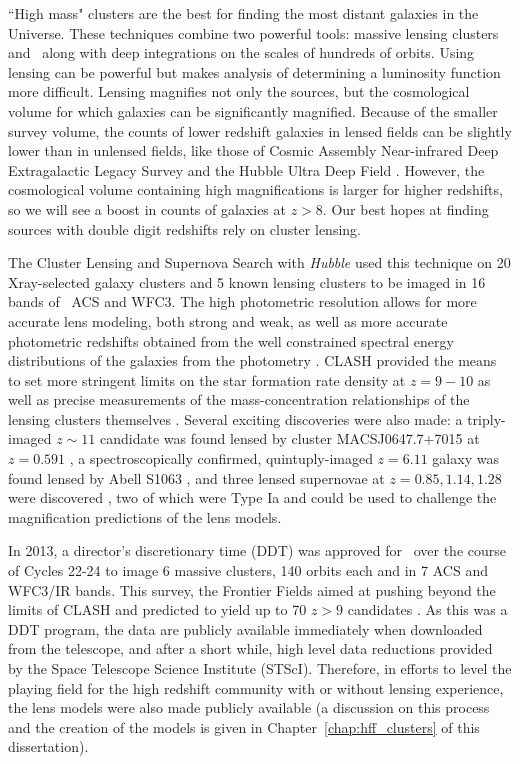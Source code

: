 ``High mass" clusters are the best for finding the most distant galaxies in the Universe. These techniques combine two powerful tools: massive lensing clusters and \hst\ along with deep integrations on the scales of hundreds of orbits. Using lensing can be powerful but makes analysis of determining a luminosity function more difficult. Lensing magnifies not only the sources, but the cosmological volume for which galaxies can be significantly magnified. Because of the smaller survey volume, the counts of lower redshift galaxies in lensed fields can be slightly lower than in unlensed fields, like those of Cosmic Assembly Near-infrared Deep Extragalactic Legacy Survey \citep[CANDELS; ][]{Grogin:2011ly} and the Hubble Ultra Deep Field \citep{Beckwith:2006rt}. However, the cosmological volume containing high magnifications is larger for higher redshifts, so we will see a boost in counts of galaxies at $z>8$. Our best hopes at finding sources with double digit redshifts rely on cluster lensing.

The Cluster Lensing and Supernova Search with {\it Hubble} \citep[CLASH; ][]{Postman:2012lr} used this technique on 20 Xray-selected galaxy clusters and 5 known lensing clusters to be imaged in 16 bands of \hst\ ACS and WFC3. The high photometric resolution allows for more accurate lens modeling, both strong and weak, as well as more accurate photometric redshifts obtained from the well constrained spectral energy distributions of the galaxies from the photometry \citep{Jouvel:2014qy}. CLASH provided the means to set more stringent limits on the star formation rate density at $z=9-10$ \citep{Bouwens:2014zp} as well as precise measurements of the mass-concentration relationships of the lensing clusters themselves \citep{Merten:2015rz,Meneghetti:2014ys}. Several exciting discoveries were also made: a triply-imaged $z\sim11$ candidate was found lensed by cluster MACSJ0647.7+7015 at $z = 0.591$ \citep{Coe:2013tg}, a spectroscopically confirmed, quintuply-imaged $z=6.11$ galaxy was found lensed by Abell S1063 \citep{Monna:2014lr,Balestra:2013uq}, and three lensed supernovae at $z=0.85,1.14,1.28$ were discovered \citep{Patel:2014kl}, two of which were Type Ia and could be used to challenge the magnification predictions of the lens models.

In 2013, a director's discretionary time (DDT) was approved for \hst\ over the course of Cycles 22-24 to image 6 massive clusters, 140 orbits each and in 7 ACS and WFC3/IR bands. This survey, the Frontier Fields \citep{Lotz:2017gd} aimed at pushing beyond the limits of CLASH and predicted to yield up to 70 $z>9$ candidates \citep{Coe:2015qf}. As this was a DDT program, the data are publicly available immediately when downloaded from the telescope, and after a short while, high level data reductions provided by the Space Telescope Science Institute (STScI). Therefore, in efforts to level the playing field for the high redshift community with or without lensing experience, the lens models were also made publicly available (a discussion on this process and the creation of the models is given in Chapter~\ref{chap:hff_clusters} of this dissertation).

